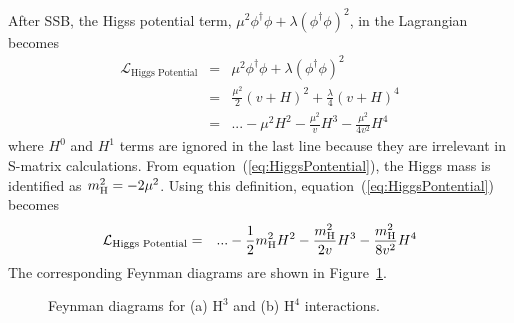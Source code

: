 After SSB, the Higss potential term,  
$\mu^2 \phi^\dagger \phi + \lambda \left( \phi^\dagger \phi \right)^2 $,
in the Lagrangian becomes 
\begin{eqnarray} 
\mathcal{L}_{\textrm{Higgs Potential}}
&=&   
\mu^2 \phi^\dagger \phi + \lambda \left( \phi^\dagger \phi \right)^2 \\ 
&=&   
\frac{\mu^2}{2} ( v + H )^2 + \frac{\lambda}{4} ( v + H )^4 \\ 
&=& 
\label{eq:HiggsPontential}
... - \mu^2 H^2 - \frac{\mu^2}{v} H^3  - \frac{\mu^2}{4v^2} H^4 
\end{eqnarray} 
where $H^0$ and $H^1$ terms are ignored in the last line
because they are irrelevant in S-matrix calculations. 
From equation~(\ref{eq:HiggsPontential}), the Higgs mass is identified 
as $m_{\mathrm{H}}^2 =  -2\mu^2$. %
Using this definition, equation~(\ref{eq:HiggsPontential}) becomes 
\begin{eqnarray} 
\mathcal{L}_{\textrm{Higgs Potential}}
&=& 
... - \frac{1}{2} m_{\mathrm{H}}^2 H^2 - \frac{m_{\mathrm{H}}^2}{2v} H^3  - \frac{m_{\mathrm{H}}^2}{8v^2} H^4    
\end{eqnarray}
The corresponding Feynman diagrams are shown in Figure~\ref{fig:fd_Hselfterm}. 
%
\begin{figure}[htp]
\centering
\vspace{1cm}
\hspace{1cm}
\caption{ Feynman diagrams for (a) $\textrm{H}^3$ and (b) $\textrm{H}^4$ interactions.
}
\vspace{0.5cm}
\label{fig:fd_Hselfterm}
\end{figure}

